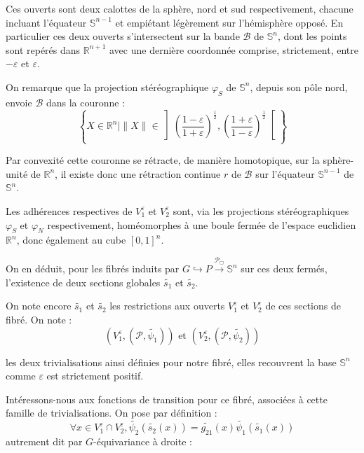 \par
Ces ouverts sont deux calottes de la sphère, nord et sud respectivement, %
chacune incluant l'équateur $\mathbb{S}^{n-1}$ et empiétant légèrement sur l'hémisphère opposé. %
En particulier ces deux ouverts s'intersectent sur la bande $\mathcal{B}$ de $\mathbb{S}^n$, %
dont les points sont repérés dans $\mathbb{R}^{n+1}$ avec une dernière coordonnée comprise, strictement, entre $-\varepsilon$ et $\varepsilon$.

\par
On remarque que la projection stéréographique $\varphi_S$ de $\mathbb{S}^n$, depuis son pôle nord, envoie $\mathcal{B}$ dans la couronne :
\[
\left\{ X \in \mathbb{R}^n | \|X\| \in \left] \left(\frac{1-\varepsilon}{1+\varepsilon}\right)^{\frac{1}{2}} , %
\left(\frac{1+\varepsilon}{1-\varepsilon}\right)^{\frac{1}{2}} \right[ \right\}
\]

Par convexité cette couronne se rétracte, de manière homotopique, sur la sphère-unité de $\mathbb{R}^n$, %
il existe donc une rétraction continue $r$ de $\mathcal{B}$ sur l'équateur $\mathbb{S}^{n-1}$ de $\mathbb{S}^n$.

\par
Les adhérences respectives de $V_1^{\varepsilon}$ et $V_2^{\varepsilon}$ sont, via les projections stéréographiques $\varphi_S$ et $\varphi_N$ respectivement, %
homéomorphes à une boule fermée de l'espace euclidien $\mathbb{R}^n$, donc également au cube $[0,1]^n$.

\par
On en déduit, pour les fibrés induits par $G \hookrightarrow P \xrightarrow{\mathcal{P}_{\Box}} \mathbb{S}^n$ sur ces deux fermés, %
l'existence de deux sections globales $\tilde{s_1}$ et $\tilde{s_2}$.

\par
On note encore $\tilde{s_1}$ et $\tilde{s_2}$ les restrictions aux ouverts $V_1^{\varepsilon}$ et $V_2^{\varepsilon}$ de ces sections de fibré. On note :
\[(V_1^{\varepsilon},(\mathcal{P},\tilde{\psi_1}))\text{ et }(V_2^{\varepsilon},(\mathcal{P},\tilde{\psi_2}))\]

les deux trivialisations ainsi définies pour notre fibré, elles recouvrent la base $\mathbb{S}^n$ comme $\varepsilon$ est strictement positif.

\par
Intéressons-nous aux fonctions de transition pour ce fibré, associées à cette famille de trivialisations. On pose par définition :
\[
\forall x \in V_1^{\varepsilon} \cap V_2^{\varepsilon} , \tilde{\psi_2}(\tilde{s_2}(x)) = \tilde{g_{21}}(x) \tilde{\psi_1}(\tilde{s_1}(x))
\]
autrement dit par $G$-équivariance à droite :

